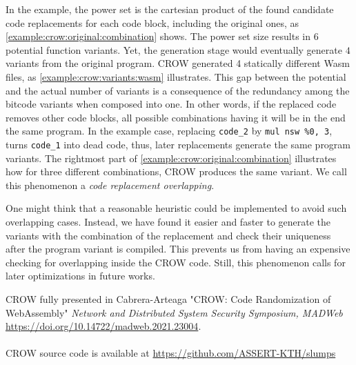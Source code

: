 In the example, the power set is the cartesian product of the found candidate code replacements for each code block, including the original ones, as \autoref{example:crow:original:combination} shows. The power set size results in $6$ potential function variants. Yet, the generation stage would eventually generate $4$ variants from the original program. CROW generated 4 statically different Wasm  files, as \autoref{example:crow:variants:wasm} illustrates. This gap between the potential and the actual number of variants is a consequence of the redundancy among the bitcode variants when composed into one. In other words, if the replaced code removes other code blocks, all possible combinations having it will be in the end the same program. In the example case, replacing \texttt{code\_2} by \texttt{mul nsw \%0, 3}, turns \texttt{code\_1} into dead code, thus, later replacements generate the same program variants. The rightmost part of \autoref{example:crow:original:combination} illustrates how for three different combinations, CROW produces the same variant. We call this phenomenon a \emph{code replacement overlapping}.



One might think that a reasonable heuristic could be implemented to avoid such overlapping cases. Instead, we have found it easier and faster to generate the variants with the combination of the replacement and check their uniqueness after the program variant is compiled. This prevents us from having an expensive checking for overlapping inside the CROW code. Still, this phenomenon calls for later optimizations in future works.



\begin{tcolorbox}[title=Contribution paper and artifact,boxrule=1pt,arc=.2em,boxsep=1.0mm]
   CROW fully presented in Cabrera-Arteaga \etal "CROW: Code Randomization of WebAssembly"
    \emph{Network and Distributed System Security Symposium, MADWeb}
    \url{https://doi.org/10.14722/madweb.2021.23004}.
    \\\\
    CROW source code is available at \url{https://github.com/ASSERT-KTH/slumps}

\end{tcolorbox}

